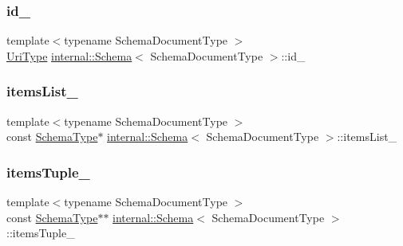 \mbox{\label{classinternal_1_1Schema_aa1cd8753669470baaa702ea16b19a93f}} 
\subsubsection{\texorpdfstring{id\+\_\+}{id\_}}
{\footnotesize\ttfamily template$<$typename Schema\+Document\+Type $>$ \\
\hyperlink{classinternal_1_1Schema_a3b6cd85c3eeebe870cf8017d9d131d35}{Uri\+Type} \hyperlink{classinternal_1_1Schema}{internal\+::\+Schema}$<$ Schema\+Document\+Type $>$\+::id\+\_\+\hspace{0.3cm}{\ttfamily [private]}}

\mbox{\label{classinternal_1_1Schema_af6c4e6c38199aaf9d63bca9fc4f2c211}} 
\subsubsection{\texorpdfstring{items\+List\+\_\+}{itemsList\_}}
{\footnotesize\ttfamily template$<$typename Schema\+Document\+Type $>$ \\
const \hyperlink{classinternal_1_1Schema_ac2556ebf7a7db971e1c1c0f76eb5786e}{Schema\+Type}$\ast$ \hyperlink{classinternal_1_1Schema}{internal\+::\+Schema}$<$ Schema\+Document\+Type $>$\+::items\+List\+\_\+\hspace{0.3cm}{\ttfamily [private]}}

\mbox{\label{classinternal_1_1Schema_ab4071c6507dc111c8041e66e744e2267}} 
\subsubsection{\texorpdfstring{items\+Tuple\+\_\+}{itemsTuple\_}}
{\footnotesize\ttfamily template$<$typename Schema\+Document\+Type $>$ \\
const \hyperlink{classinternal_1_1Schema_ac2556ebf7a7db971e1c1c0f76eb5786e}{Schema\+Type}$\ast$$\ast$ \hyperlink{classinternal_1_1Schema}{internal\+::\+Schema}$<$ Schema\+Document\+Type $>$\+::items\+Tuple\+\_\+\hspace{0.3cm}{\ttfamily [private]}}

